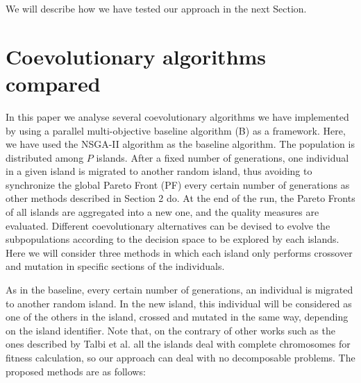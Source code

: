 \documentclass[preprint]{elsarticle}
\begin{document}
We will describe how we have tested our approach in the next Section.




%
%

\section{Coevolutionary algorithms compared}
\label{sec:coevo}

In this paper we analyse several coevolutionary algorithms we have implemented by using a parallel multi-objective baseline algorithm (B) as a framework. Here, we have used the NSGA-II algorithm as the baseline algorithm. The population is distributed among $P$ islands. After a fixed number of generations, one individual in a given island is migrated to another random island, thus avoiding to synchronize the global Pareto Front (PF) every certain number of generations as other methods described in Section 2 do. At the end of the run, the Pareto Fronts of all islands are aggregated into a new one, and the quality measures are evaluated.
Different coevolutionary alternatives can be devised to evolve the subpopulations according to the decision space to be explored by each islands. Here we will consider three methods in which each island only performs crossover and mutation in specific sections of the individuals.



%

As in the baseline, every certain number of generations, an individual is migrated to another random island.  In the new island, this individual will be considered as one of the others in the island, crossed and mutated in the same way, depending on the island identifier. Note that, on the contrary of other works such as the ones described by Talbi et al. \citep{Talbi08Parallel} all the islands deal with complete chromosomes for fitness calculation, so our approach can deal with no decomposable problems. The proposed methods  are as follows:
\end{document}
